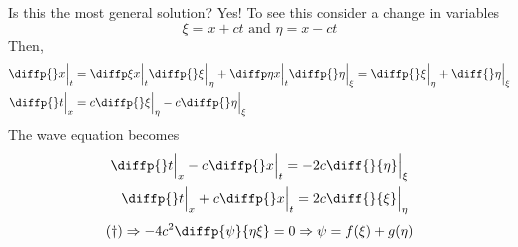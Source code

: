 \documentclass{article}
\begin{document}
Is this the most general solution? Yes! To see this consider a change in variables
\[
    \xi = x + ct \text{ and } \eta = x - ct    
\]
Then,
\begin{align*}
    \diffp {}x \eval_{t} &= \diffp \xi x \eval_{t} \diffp {}\xi \eval_{\eta} + \diffp \eta x \eval_{t} \diffp {}\eta \eval_{\xi} = \diffp {}\xi \eval_{\eta} + \diff{}\eta \eval_{\xi} \\
    \diffp {}t \eval_{x} &= c \diffp {}\xi \eval_{\eta} - c \diffp {}\eta \eval_{\xi} 
\end{align*}
The wave equation becomes
\begin{align*}
    \diffp {}t \eval_{x} - c\diffp {}x \eval_{t} = -2 c \diff{}{\eta} \eval_{\xi} \\
    \diffp {}t \eval_{x} + c\diffp {}x \eval_{t} = 2 c \diff{}{\xi} \eval_{\eta} \\
\end{align*}
\[
    \text{\refdagger} \Rightarrow -4c^2 \diffp{\psi}{{\eta}{\xi}} = 0 \Rightarrow \psi = f(\xi) + g(\eta)
\]
\end{document}
